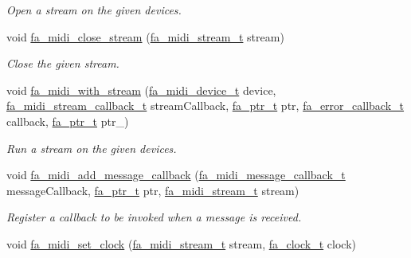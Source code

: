\begin{DoxyCompactItemize}
\begin{DoxyCompactList}\small\item\em Open a stream on the given devices. \end{DoxyCompactList}\item 
void \hyperlink{group___fa_midi_ga8a306a27cb08528a31b9fdad6b4f75ab}{fa\-\_\-midi\-\_\-close\-\_\-stream} (\hyperlink{group___fa_midi_ga85772039b62d8bb718a51e1ffbbb2fa2}{fa\-\_\-midi\-\_\-stream\-\_\-t} stream)
\begin{DoxyCompactList}\small\item\em Close the given stream. \end{DoxyCompactList}\item 
void \hyperlink{group___fa_midi_ga2b3813b25c03a1c609afd039e7565599}{fa\-\_\-midi\-\_\-with\-\_\-stream} (\hyperlink{group___fa_midi_gabbbfd1ec30a186768ba2744e46bacc9b}{fa\-\_\-midi\-\_\-device\-\_\-t} device, \hyperlink{group___fa_midi_ga8022098ffcf993ccdaed068b97ab7bfc}{fa\-\_\-midi\-\_\-stream\-\_\-callback\-\_\-t} stream\-Callback, \hyperlink{group___fa_ga915ddeae99ad7568b273d2b876425197}{fa\-\_\-ptr\-\_\-t} ptr, \hyperlink{group___fa_error_ga43d8d45a005130a5052ba3281a8bf33e}{fa\-\_\-error\-\_\-callback\-\_\-t} callback, \hyperlink{group___fa_ga915ddeae99ad7568b273d2b876425197}{fa\-\_\-ptr\-\_\-t} ptr\-\_\-)
\begin{DoxyCompactList}\small\item\em Run a stream on the given devices. \end{DoxyCompactList}\item 
void \hyperlink{group___fa_midi_ga52859a899712bbbac285d7474f546bf0}{fa\-\_\-midi\-\_\-add\-\_\-message\-\_\-callback} (\hyperlink{group___fa_midi_ga446c3043288f44554ba1c69ab03f4a1d}{fa\-\_\-midi\-\_\-message\-\_\-callback\-\_\-t} message\-Callback, \hyperlink{group___fa_ga915ddeae99ad7568b273d2b876425197}{fa\-\_\-ptr\-\_\-t} ptr, \hyperlink{group___fa_midi_ga85772039b62d8bb718a51e1ffbbb2fa2}{fa\-\_\-midi\-\_\-stream\-\_\-t} stream)
\begin{DoxyCompactList}\small\item\em Register a callback to be invoked when a message is received. \end{DoxyCompactList}\item 
void \hyperlink{group___fa_midi_gacfa36ef71f8c8d797a040e35b72aff58}{fa\-\_\-midi\-\_\-set\-\_\-clock} (\hyperlink{group___fa_midi_ga85772039b62d8bb718a51e1ffbbb2fa2}{fa\-\_\-midi\-\_\-stream\-\_\-t} stream, \hyperlink{group___fa_clock_ga20b3a0f49788fbedba140b1d315d2313}{fa\-\_\-clock\-\_\-t} clock)

\end{DoxyCompactItemize}
